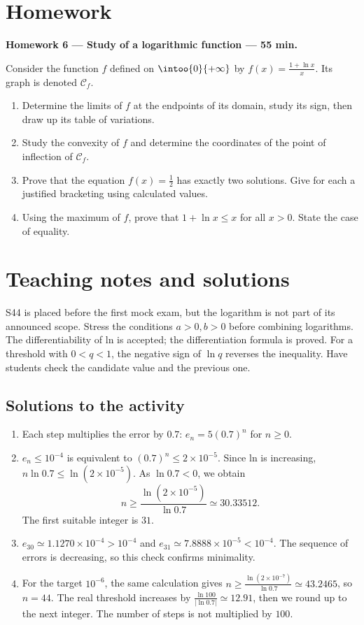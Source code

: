 \mxnewpage
\section{Homework}\textbf{Homework 6 --- Study of a logarithmic function --- 55 min.}\par Consider the function $f$ defined on $\intoo{0}{+\infty}$ by $f(x)=\frac{1+\ln x}{x}$. Its graph is denoted $\mathcal C_f$.
\begin{enumerate}\item Determine the limits of $f$ at the endpoints of its domain, study its sign, then draw up its table of variations.
\item Study the convexity of $f$ and determine the coordinates of the point of inflection of $\mathcal C_f$.
\item Prove that the equation $f(x)=\frac12$ has exactly two solutions. Give for each a justified bracketing using calculated values.
\item Using the maximum of $f$, prove that $1+\ln x\le x$ for all $x>0$. State the case of equality.\end{enumerate}

\ifmxteacher\mxnewpage\section{Teaching notes and solutions}\begin{teachernote}S44 is placed before the first mock exam, but the logarithm is not part of its announced scope. Stress the conditions $a>0,b>0$ before combining logarithms. The differentiability of ln is accepted; the differentiation formula is proved. For a threshold with $0<q<1$, the negative sign of $\ln q$ reverses the inequality. Have students check the candidate value and the previous one.\end{teachernote}

\subsection{Solutions to the activity}\begin{enumerate}
\item Each step multiplies the error by $\num{0,7}$: $e_n=5(\num{0,7})^n$ for $n\ge0$.
\item $e_n\le10^{-4}$ is equivalent to $(\num{0,7})^n\le2\times10^{-5}$. Since ln is increasing, $n\ln\num{0,7}\le\ln(2\times10^{-5})$. As $\ln\num{0,7}<0$, we obtain
\[n\ge\frac{\ln(2\times10^{-5})}{\ln\num{0,7}}\simeq\num{30,33512}.\]
The first suitable integer is $31$.
\item $e_{30}\simeq\num{1,1270}\times10^{-4}>10^{-4}$ and $e_{31}\simeq\num{7,8888}\times10^{-5}<10^{-4}$. The sequence of errors is decreasing, so this check confirms minimality.
\item For the target $10^{-6}$, the same calculation gives $n\ge\frac{\ln (2\times10^{-7})}{\ln \num{0,7}}\simeq\num{43,2465}$, so $n=44$. The real threshold increases by $\frac{\ln 100}{|\ln\num{0,7}|}\simeq\num{12,91}$, then we round up to the next integer. The number of steps is not multiplied by $100$.
\end{enumerate}

